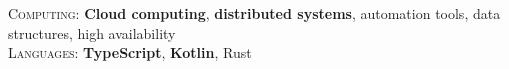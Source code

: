 %
%
%


    \textsc{Computing:} \hspace{0.5cm} \textbf{Cloud computing}, \textbf{distributed systems}, automation tools, data structures, high availability \\
    \textsc{ Languages:} \hspace{0.6cm} \textbf{TypeScript}, \textbf{Kotlin}, Rust \\
